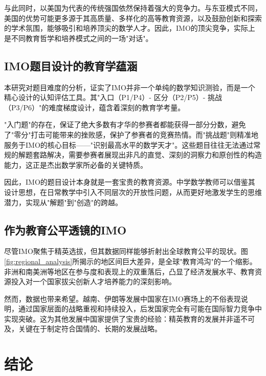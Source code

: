 \documentclass[12pt,a4paper]{article}
\begin{document}
与此同时，以美国为代表的传统强国依然保持着强大的竞争力。与东亚模式不同，美国的优势可能更多源于其高质量、多样化的高等教育资源，以及鼓励创新和探索的学术氛围，能够吸引和培养顶尖的数学人才。因此，IMO的顶尖竞争，实际上是不同教育哲学和培养模式之间的一场"对话"。

\subsection{IMO题目设计的教育学蕴涵}

本研究对题目难度的分析，证实了IMO并非一个单纯的数学知识测验，而是一个精心设计的认知评估工具。其"入口（P1/P4）- 区分（P2/P5）- 挑战（P3/P6）"的难度梯度设计，蕴含着深刻的教育学考量。

"入门题"的存在，保证了绝大多数有才华的参赛者都能获得一部分分数，避免了"零分"打击可能带来的挫败感，保护了参赛者的竞赛热情。而"挑战题"则精准地服务于IMO的核心目标——"识别最高水平的数学天才"\cite{gifted_mathematics_education}。这些题目往往无法通过常规的解题套路解决，需要参赛者展现出非凡的直觉、深刻的洞察力和原创性的构造能力，这正是杰出数学家所必备的关键特质\cite{problem_solving_strategies}。

因此，IMO的题目设计本身就是一套宝贵的教育资源。中学数学教师可以借鉴其设计思想，在日常教学中引入不同层次的开放性问题，从而更好地激发学生的思维潜力，实现从"解题"到"创造"的跨越。

\subsection{作为教育公平透镜的IMO}

尽管IMO聚焦于精英选拔，但其数据同样能够折射出全球教育公平的现状。图\ref{fig:regional_analysis}所揭示的地区间巨大差异，是全球"教育鸿沟"的一个缩影。非洲和南美洲等地区在参与度和表现上的双重落后，凸显了经济发展水平、教育资源投入对一个国家拔尖创新人才培养能力的深刻影响。

然而，数据也带来希望。越南、伊朗等发展中国家在IMO赛场上的不俗表现说明，通过国家层面的战略重视和持续投入，后发国家完全有可能在国际智力竞争中实现突破。这为其他发展中国家提供了宝贵的经验：精英教育的发展并非遥不可及，关键在于制定符合国情的、长期的发展战略。

\section{结论}
\end{document}

